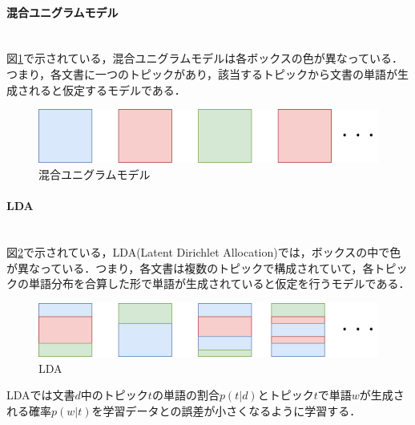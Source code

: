 \paragraph{混合ユニグラムモデル}\ \\
図\ref{Fig:mixUnigram}で示されている，混合ユニグラムモデルは各ボックスの色が異なっている．つまり，各文書に一つのトピックがあり，該当するトピックから文書の単語が生成されると仮定するモデルである．
\begin{figure}[htbp]
 \begin{center}
  \includegraphics[width=\textwidth]{../images/2.Related_Work/topicModel-mixUnigram.png}
  \caption{混合ユニグラムモデル}
  \label{Fig:mixUnigram}
  \vspace{-10pt}
 \end{center}
\end{figure}
\paragraph{LDA}\ \\
図\ref{Fig:LDA}で示されている，LDA(Latent Dirichlet Allocation)\cite{LDA2003}では，ボックスの中で色が異なっている．つまり，各文書は複数のトピックで構成されていて，各トピックの単語分布を合算した形で単語が生成されていると仮定を行うモデルである．
\begin{figure}[htbp]
 \begin{center}
  \includegraphics[width=\textwidth]{../images/2.Related_Work/topicModel-LDA.png}
  \caption{LDA}
  \label{Fig:LDA}
  \vspace{-10pt}
 \end{center}
\end{figure}

LDAでは文書$d$中のトピック$t$の単語の割合$p(t|d)$とトピック$t$で単語$w$が生成される確率$p(w|t)$を学習データとの誤差が小さくなるように学習する．

